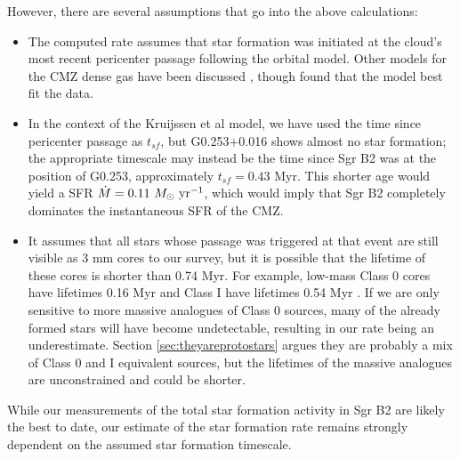 \documentclass[twocolumn]{aastex61}
\begin{document}
However, there are several assumptions that go into the above calculations:
\begin{itemize}
    \item The computed rate assumes that star formation was initiated at the
        cloud's most recent pericenter passage following the
        \citet{Kruijssen2015a} orbital model.  Other models for the CMZ
        dense gas have been discussed
        \citep[e.g.,][]{Molinari2011a,Sofue2017b,Ridley2017a}, though 
        \citet{Henshaw2016a} found that the \citet{Kruijssen2015a} model
        best fit the data.
    \item In the context of the Kruijssen et al model, we have used the time
        since pericenter passage as $t_{sf}$, but G0.253+0.016 shows almost no
        star formation; the appropriate timescale may instead be the time since
        Sgr B2 was at the position of G0.253, approximately $t_{sf}=0.43$ Myr.
        This shorter age would yield a SFR
        ${\dot{M}=0.11~M_{\odot}~\textrm{yr}^{-1}}$, which would imply that Sgr
        B2 completely dominates the instantaneous SFR of the CMZ.
    \item It  assumes that all stars whose passage was triggered at that event
        are still visible as 3 mm cores to our survey, but it is possible that
        the lifetime of these cores is shorter than 0.74 Myr.  For example,
        low-mass Class 0 cores have lifetimes 0.16 Myr and Class I have
        lifetimes 0.54 Myr \citep{Evans2009a}.  If we are only sensitive to 
        more massive analogues of Class 0 sources, many of the already formed
        stars will have become undetectable, resulting in our rate being
        an underestimate.  Section \ref{sec:theyareprotostars} argues
        they are probably a mix of Class 0 and I equivalent sources,
        but the lifetimes of the massive analogues are unconstrained
        and could be shorter.
\end{itemize}

While our measurements of the total star formation activity in Sgr B2 are
likely the best to date, our estimate of the star formation rate remains
strongly dependent on the assumed star formation timescale.


% 
\end{document}
